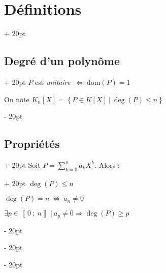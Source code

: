 \documentclass[a4paper, 12pt, twoside]{article}
\newcommand{\nset}[2]{\left\llbracket #1\ ;\ #2 \right\rrbracket}
\newcommand{\ssi}{\ \Leftrightarrow \ }
\newcommand{\set}[1]{\left\{ #1 \right\}}
\renewcommand{\le}{\leqslant}
\renewcommand{\ge}{\geqslant}
\newcommand{\dom}{\mathrm{dom}}
\newcommand{\ind}[1][20pt]{\advance\leftskip + #1}
\newcommand{\deind}[1][20pt]{\advance\leftskip - #1}
\newenvironment{indt}[2][20pt]{#2 \par \ind[#1]}{\par \deind} %
\begin{document}
\begin{indt}{\section{Définitions}}
\begin{indt}{\subsection{Degré d'un polynôme}}
            $P$ est \textit{unitaire} $\ssi \dom(P) = 1$
            
            \vspace{6pt}
            
            On note $K_n[X] = \set{P \in K[X]\ |\ \deg(P) \le n}$
        \end{indt}
        
        \vspace{12pt}
        
        \begin{indt}{\subsection{Propriétés}}
            Soit $\displaystyle P = \sum_{k = 0}^n a_k X^k$. Alors :
            
            \vspace{6pt}
            
            \begin{indt}{}
                $\deg(P) \le n$
                
                $\deg(P) = n \ssi a_n \neq 0$
                
                $\exists p \in \nset{0}{n}\ |\ a_p \neq 0 \Rightarrow \deg(P) \ge p$
            \end{indt}
        \end{indt}
        
    \end{indt}
    
    \vspace{12pt}
    
\end{document}
